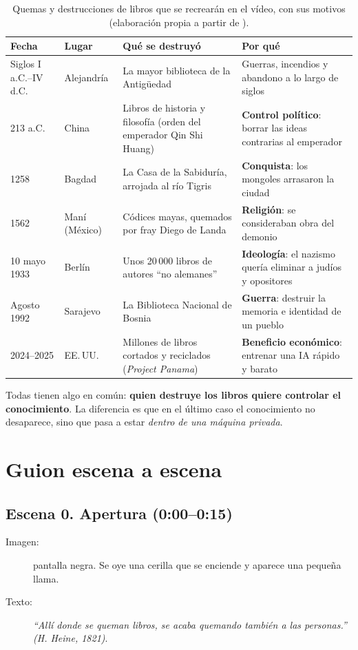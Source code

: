 \documentclass[11pt,a4paper,twoside,openright]{book}
\begin{document}
\begin{table}[htbp]
  \centering
  \caption[Quemas de libros recreadas en el vídeo]{Quemas y destrucciones de
    libros que se recrearán en el vídeo, con sus motivos
    (elaboración propia a partir de \cite{baez2004}).}
  \label{tab:quemas}
  \small
  \begin{tabularx}{\textwidth}{@{}llXX@{}}
    \toprule
    \textbf{Fecha} & \textbf{Lugar} & \textbf{Qué se destruyó} & \textbf{Por qué} \\
    \midrule
    Siglos I a.C.--IV d.C. & Alejandría & La mayor biblioteca de la Antigüedad
      & Guerras, incendios y abandono a lo largo de siglos \\
    213 a.C.  & China   & Libros de historia y filosofía (orden del emperador Qin Shi Huang)
      & \textbf{Control político}: borrar las ideas contrarias al emperador \\
    1258      & Bagdad  & La Casa de la Sabiduría, arrojada al río Tigris
      & \textbf{Conquista}: los mongoles arrasaron la ciudad \\
    1562      & Maní (México) & Códices mayas, quemados por fray Diego de Landa
      & \textbf{Religión}: se consideraban obra del demonio \\
    10 mayo 1933 & Berlín & Unos 20\,000 libros de autores ``no alemanes''
      & \textbf{Ideología}: el nazismo quería eliminar a judíos y opositores \\
    Agosto 1992 & Sarajevo & La Biblioteca Nacional de Bosnia
      & \textbf{Guerra}: destruir la memoria e identidad de un pueblo \\
    2024--2025 & EE.\,UU. & Millones de libros cortados y reciclados (\textit{Project Panama})
      & \textbf{Beneficio económico}: entrenar una IA rápido y barato \\
    \bottomrule
  \end{tabularx}
\end{table}

Todas tienen algo en común: \textbf{quien destruye los libros quiere controlar el
conocimiento}. La diferencia es que en el último caso el conocimiento no
desaparece, sino que pasa a estar \emph{dentro de una máquina privada}.

\section{Guion escena a escena}

\subsection*{Escena 0. Apertura (0:00--0:15)}
\begin{description}
  \item[Imagen:] pantalla negra. Se oye una cerilla que se enciende y aparece una
        pequeña llama.
  \item[Texto:] \textit{``Allí donde se queman libros, se acaba quemando también
        a las personas.'' (H. Heine, 1821)}.
\end{description}
\end{document}
